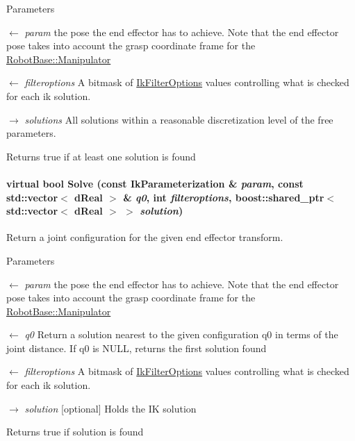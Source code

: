 \begin{DoxyParams}{Parameters}
\item[\mbox{$\leftarrow$} {\em param}]the pose the end effector has to achieve. Note that the end effector pose takes into account the grasp coordinate frame for the \hyperlink{classOpenRAVE_1_1RobotBase_1_1Manipulator}{RobotBase::Manipulator} \item[\mbox{$\leftarrow$} {\em filteroptions}]A bitmask of \hyperlink{namespaceOpenRAVE_a89401ff7c557d6d1ede96b550fb22bdc}{IkFilterOptions} values controlling what is checked for each ik solution. \item[\mbox{$\rightarrow$} {\em solutions}]All solutions within a reasonable discretization level of the free parameters. \end{DoxyParams}
\begin{DoxyReturn}{Returns}
true if at least one solution is found 
\end{DoxyReturn}
\hypertarget{classOpenRAVE_1_1IkSolverBase_a283c44d6bd1ab0023aa8079f2f22db0a}{
\paragraph[{Solve}]{\setlength{\rightskip}{0pt plus 5cm}virtual bool Solve (const {\bf IkParameterization} \& {\em param}, \/  const std::vector$<$ dReal $>$ \& {\em q0}, \/  int {\em filteroptions}, \/  boost::shared\_\-ptr$<$ std::vector$<$ dReal $>$ $>$ {\em solution})}\hfill}
\label{classOpenRAVE_1_1IkSolverBase_a283c44d6bd1ab0023aa8079f2f22db0a}


Return a joint configuration for the given end effector transform. 


\begin{DoxyParams}{Parameters}
\item[\mbox{$\leftarrow$} {\em param}]the pose the end effector has to achieve. Note that the end effector pose takes into account the grasp coordinate frame for the \hyperlink{classOpenRAVE_1_1RobotBase_1_1Manipulator}{RobotBase::Manipulator} \item[\mbox{$\leftarrow$} {\em q0}]Return a solution nearest to the given configuration q0 in terms of the joint distance. If q0 is NULL, returns the first solution found \item[\mbox{$\leftarrow$} {\em filteroptions}]A bitmask of \hyperlink{namespaceOpenRAVE_a89401ff7c557d6d1ede96b550fb22bdc}{IkFilterOptions} values controlling what is checked for each ik solution. \item[\mbox{$\rightarrow$} {\em solution}]\mbox{[}optional\mbox{]} Holds the IK solution \end{DoxyParams}
\begin{DoxyReturn}{Returns}
true if solution is found 
\end{DoxyReturn}
